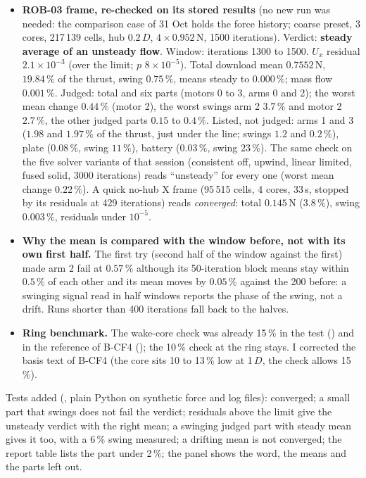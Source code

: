 \begin{itemize}[nosep]
  \item \textbf{ROB-03 frame, re-checked on its stored results} (no new run was needed: the comparison case of 31 Oct holds the
        force history; coarse preset, 3 cores, 217\,139 cells, hub $0.2\,D$, $4\times0.952$\,N, 1500 iterations). Verdict:
        \textbf{steady average of an unsteady flow}. Window: iterations 1300 to 1500. $U_x$ residual $2.1\times10^{-3}$ (over the
        limit; $p$ $8\times10^{-5}$). Total download mean $0.7552$\,N, $19.84\,\%$ of the thrust, swing $0.75\,\%$, means
        steady to $0.000\,\%$; mass flow $0.001\,\%$. Judged: total and six parts (motors 0 to 3, arms 0 and 2); the worst
        mean change $0.44\,\%$ (motor 2), the worst swings arm 2 $3.7\,\%$ and motor 2 $2.7\,\%$, the other judged parts
        $0.15$ to $0.4\,\%$. Listed, not judged: arms 1 and 3 ($1.98$ and $1.97\,\%$ of the thrust, just under the line; swings $1.2$
        and $0.2\,\%$), plate ($0.08\,\%$, swing $11\,\%$), battery ($0.03\,\%$, swing $23\,\%$). The same check on the five solver
        variants of that session (consistent off, upwind, linear limited, fused solid, 3000 iterations) reads ``unsteady'' for
        every one (worst mean change $0.22\,\%$). A quick no-hub X frame (95\,515 cells, 4 cores, 33\,s, stopped by its residuals
        at 429 iterations) reads \emph{converged}: total $0.145$\,N ($3.8\,\%$), swing $0.003\,\%$, residuals under $10^{-5}$.
  \item \textbf{Why the mean is compared with the window before, not with its own first half.} The first try (second half of the
        window against the first) made arm 2 fail at $0.57\,\%$ although its 50-iteration block means stay within
        $0.5\,\%$ of each other and its mean moves by $0.05\,\%$ against the 200 before: a swinging signal read in half windows
        reports the phase of the swing, not a drift. Runs shorter than 400 iterations fall back to the halves.
  \item \textbf{Ring benchmark.} The wake-core check was already 15\,\% in the test
        () and in the  reference of B-CF4
        (); the 10\,\% check at the ring stays. I corrected the basis text of B-CF4 (the core
        sits 10 to 13\,\% low at 1\,$D$, the check allows 15\,\%).
\end{itemize}
Tests added (, plain Python on synthetic force and log files): converged; a small part that swings does not
fail the verdict; residuals above the limit give the unsteady verdict with the right mean; a swinging judged part with steady mean
gives it too, with a 6\,\% swing measured; a drifting mean is not converged; the report table lists the part under 2\,\%; the
panel shows the word, the means and the parts left out.

